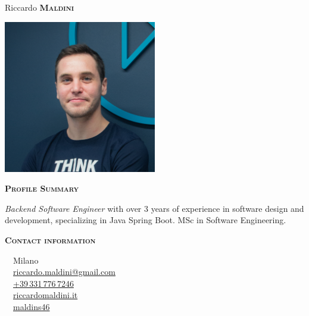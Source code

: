 \documentclass[11pt, a4paper]{article}
\newcommand{\headleft}[1]{\vspace*{3ex}\textsc{\textbf{#1}}\par%
    \vspace*{-1.5ex}\hrulefill\par\vspace*{0.7ex}}
\begin{document}
\setlength{\topskip}{0pt}
\setlength{\parindent}{0pt}
\setlength{\parskip}{0pt}
\setlength{\fboxsep}{0pt}
\pagestyle{empty}
\raggedbottom

\begin{minipage}[t]{0.33\textwidth} %
\colorbox{cvblue}{\begin{minipage}[t][5mm][t]{\textwidth}\null\hfill\null\end{minipage}}

\vspace{-.2ex} %
\colorbox{cvblue!90}{\color{white}  %
\textwidth\relax%
\begin{minipage}[t][293mm][t]{0.82\textwidth}
\raggedright
\vspace*{2.5ex}

\Large Riccardo \textbf{\textsc{Maldini}} \normalsize 

\null\hfill\includegraphics[width=0.50\textwidth]{profile.png}\hfill\null

\vspace*{0.5ex} %

\headleft{Profile Summary}
\small
\textit{Backend Software Engineer} with over 3 years of experience in software design and development, specializing in Java Spring Boot. MSc in Software Engineering.

\headleft{Contact information}
\faHome\ \ Milano\\[0.5ex]
\faEnvelope\ \ \href{mailto:riccardo.maldini@gmail.com}{riccardo.maldini@gmail.com} \\[0.5ex]
\faPhone\ \ \href{tel:393317767246}{+39\,331\,776\,7246}
 \\[0.5ex]
\faGlobeAmericas\ \ \href{https://www.riccardomaldini.it}{riccardomaldini.it}\\[0.5ex]
\faGithub\ \  \href{https://github.com/maldins46}{maldins46}


\end{minipage}}
\end{minipage}
\end{document}
